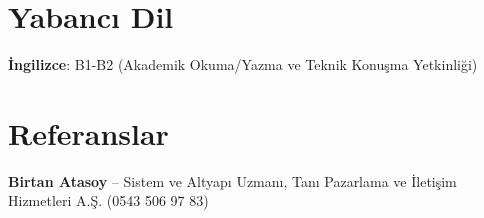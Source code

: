 \documentclass[letterpaper,11pt]{article}
\begin{document}
\section{Yabancı Dil}
 \begin{itemize}[leftmargin=0.15in, label={}]
    \small{\item{
     \textbf{İngilizce}{: B1-B2 (Akademik Okuma/Yazma ve Teknik Konuşma Yetkinliği)}
    }}
 \end{itemize}

\section{Referanslar}
 \begin{itemize}[leftmargin=0.15in, label={}]
    \small{\item{
     \textbf{Birtan Atasoy} -- Sistem ve Altyapı Uzmanı, Tanı Pazarlama ve İletişim Hizmetleri A.Ş. (0543 506 97 83)
    }}
 \end{itemize}
\end{document}
